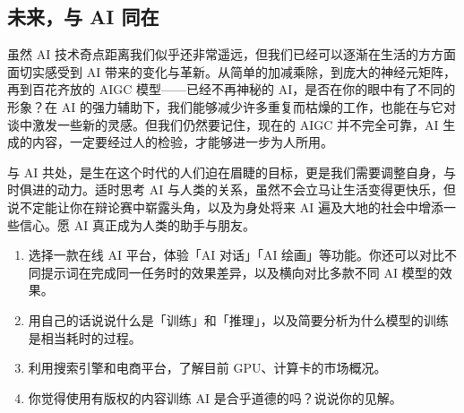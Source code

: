 \subsection{未来，与 AI 同在}

虽然 AI 技术奇点距离我们似乎还非常遥远，但我们已经可以逐渐在生活的方方面面切实感受到 AI 带来的变化与革新。从简单的加减乘除，到庞大的神经元矩阵，再到百花齐放的 AIGC 模型——已经不再神秘的 AI，是否在你的眼中有了不同的形象？在 AI 的强力辅助下，我们能够减少许多重复而枯燥的工作，也能在与它对谈中激发一些新的灵感。但我们仍然要记住，现在的 AIGC 并不完全可靠，AI 生成的内容，一定要经过人的检验，才能够进一步为人所用。

与 AI 共处，是生在这个时代的人们迫在眉睫的目标，更是我们需要调整自身，与时俱进的动力。适时思考 AI 与人类的关系，虽然不会立马让生活变得更快乐，但说不定能让你在辩论赛中崭露头角，以及为身处将来 AI 遍及大地的社会中增添一些信心。愿 AI 真正成为人类的助手与朋友。

\practice

\begin{enumerate}
  \item 选择一款在线 AI 平台，体验「AI 对话」「AI 绘画」等功能。你还可以对比不同提示词在完成同一任务时的效果差异，以及横向对比多款不同 AI 模型的效果。
  \item 用自己的话说说什么是「训练」和「推理」，以及简要分析为什么模型的训练是相当耗时的过程。
  \item 利用搜索引擎和电商平台，了解目前 GPU、计算卡的市场概况。
  \item 你觉得使用有版权的内容训练 AI 是合乎道德的吗？说说你的见解。
\end{enumerate}